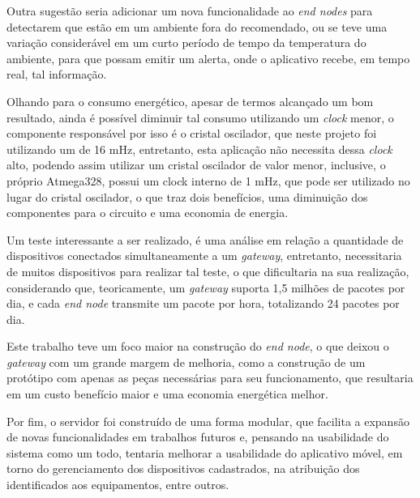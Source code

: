 Outra sugestão seria adicionar um nova funcionalidade ao \textit{end nodes} para detectarem que estão em um ambiente fora do recomendado, ou se teve uma variação considerável em um curto período de tempo da temperatura do ambiente, para que possam emitir um alerta, onde o aplicativo recebe, em tempo real, tal informação.

Olhando para o consumo energético, apesar de termos alcançado um bom resultado, ainda é possível diminuir tal consumo utilizando um \textit{clock} menor, o componente responsável por isso é o cristal oscilador, que neste projeto foi utilizando um de 16 mHz,  entretanto, esta aplicação não necessita dessa \textit{clock} alto, podendo assim utilizar um cristal oscilador de valor menor, inclusive, o próprio Atmega328, possui um clock interno de 1 mHz, que pode ser utilizado no lugar do cristal oscilador, o que traz dois benefícios, uma diminuição dos componentes para o circuito e uma economia de energia.

Um teste interessante a ser realizado, é uma análise em relação a quantidade de dispositivos conectados simultaneamente a um \textit{gateway}, entretanto, necessitaria de muitos dispositivos para realizar tal teste, o que dificultaria na sua realização, considerando que, teoricamente, um \textit{gateway} suporta 1,5 milhões de pacotes por dia, e cada \textit{end node} transmite um pacote por hora, totalizando 24 pacotes por dia.

Este trabalho teve um foco maior na construção do \textit{end node}, o que deixou o \textit{gateway} com um grande margem de melhoria, como a construção de um protótipo com apenas as peças necessárias para seu funcionamento, que resultaria em um custo benefício maior e uma economia energética melhor.

Por fim, o servidor foi construído de uma forma modular, que facilita a expansão de novas funcionalidades em trabalhos futuros e, pensando na usabilidade do sistema como um todo, tentaria melhorar a usabilidade do aplicativo móvel, em torno do gerenciamento dos dispositivos cadastrados, na atribuição dos identificados aos equipamentos, entre outros.